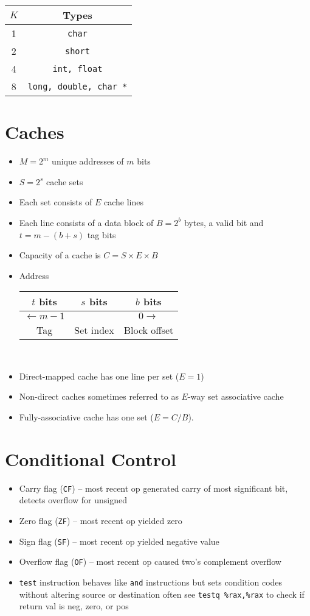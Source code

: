 \documentclass[twocolumn]{article}
\renewcommand{\tt}[1]{\texttt{#1}}
\begin{document}
\begin{tabular}{| c || c |} \hline
    $K$ & Types \\ \hline
    1 & \tt{char} \\ \hline
    2 & \tt{short} \\ \hline
    4 & \tt{int, float} \\ \hline
    8 & \tt{long, double, char *} \\ \hline
\end{tabular}

\vfill

\section{Caches}
\begin{itemize}[noitemsep]
    \item $M = 2^m$ unique addresses of $m$ bits
    \item $S = 2^s$ cache sets
    \item Each set consists of $E$ cache lines
    \item Each line consists of a data block of $B = 2^b$ bytes, a valid bit and $t = m - (b + s)$ tag bits 
    \item Capacity of a cache is $C = S \times E \times B$
    \item Address \\
    
    \begin{tabular}{| c | c | c |}
        $t$ bits & $s$ bits & $b$ bits \\ \hline
        $\leftarrow m - 1$ && $0 \rightarrow$ \\ \hline
        Tag & Set index & Block offset
    \end{tabular} \\
    \item Direct-mapped cache has one line per set ($E = 1$)
    \item Non-direct caches sometimes referred to as $E$-way set associative cache
    \item Fully-associative cache has one set ($E = C/B$).
\end{itemize}

\section{Conditional Control}
\begin{itemize}[noitemsep]
    \item Carry flag (\tt{CF}) -- most recent op generated carry of most significant bit, detects overflow for unsigned
    \item Zero flag (\tt{ZF}) -- most recent op yielded zero
    \item Sign flag (\tt{SF}) -- most recent op yielded negative value
    \item Overflow flag (\tt{OF}) -- most recent op caused two's complement overflow
    \item \tt{test} instruction behaves like \tt{and} instructions but sets condition codes without altering source or destination often see \tt{testq \%rax,\%rax} to check if return val is neg, zero, or pos
\end{itemize}
\end{document}
